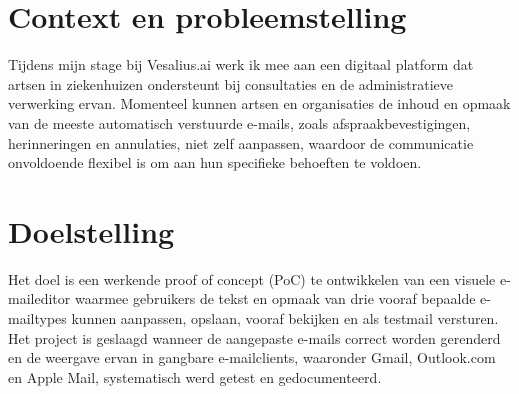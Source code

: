

\section{Context en probleemstelling}%
\label{vst:context}


Tijdens mijn stage bij Vesalius.ai werk ik mee aan een digitaal platform dat
artsen in ziekenhuizen ondersteunt bij consultaties en de administratieve
verwerking ervan. Momenteel kunnen artsen en organisaties de inhoud en opmaak
van de meeste automatisch verstuurde e-mails, zoals afspraakbevestigingen,
herinneringen en annulaties, niet zelf aanpassen, waardoor de communicatie
onvoldoende flexibel is om aan hun specifieke behoeften te voldoen.


\section{Doelstelling}%
\label{vst:doelstelling}


Het doel is een werkende proof of concept (PoC) te ontwikkelen van een visuele
e-maileditor waarmee gebruikers de tekst en opmaak van drie vooraf bepaalde
e-mailtypes kunnen aanpassen, opslaan, vooraf bekijken en als testmail
versturen. Het project is geslaagd wanneer de aangepaste e-mails correct worden
gerenderd en de weergave ervan in gangbare e-mailclients, waaronder Gmail,
Outlook.com en Apple Mail, systematisch werd getest en gedocumenteerd.


